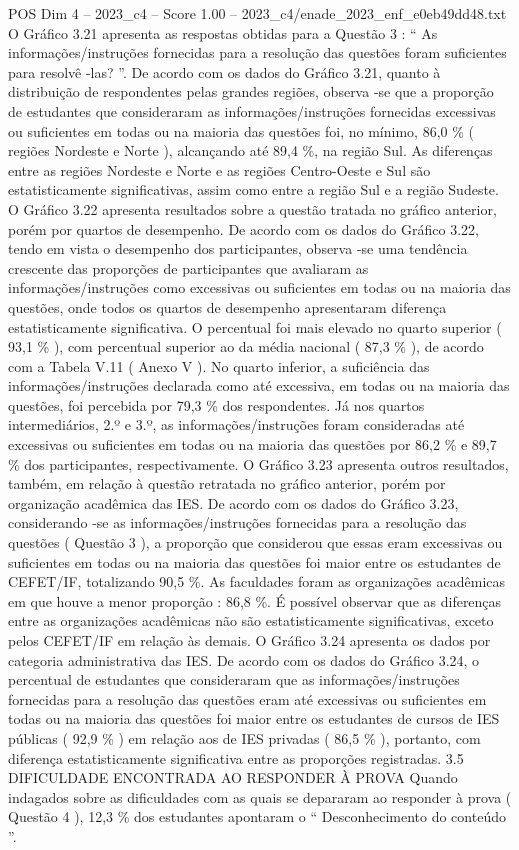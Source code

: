 \begin{textsample}{POS Dim 4 – 2023\_c4 – Score 1.00 – 2023\_c4/enade\_2023\_enf\_e0eb49dd48.txt}
O Gráfico 3.21 apresenta as respostas obtidas para a Questão 3 : “ As informações/instruções fornecidas para a resolução das questões foram suficientes para resolvê -las? ”.
De acordo com os dados do Gráfico 3.21, quanto à distribuição de respondentes pelas grandes regiões, observa -se que a proporção de estudantes que consideraram as informações/instruções fornecidas excessivas ou suficientes em todas ou na maioria das questões foi, no mínimo, 86,0 \% ( regiões Nordeste e Norte ), alcançando até 89,4 \%, na região Sul.
As diferenças entre as regiões Nordeste e Norte e as regiões Centro-Oeste e Sul são estatisticamente significativas, assim como entre a região Sul e a região Sudeste.
O Gráfico 3.22 apresenta resultados sobre a questão tratada no gráfico anterior, porém por quartos de desempenho.
De acordo com os dados do Gráfico 3.22, tendo em vista o desempenho dos participantes, observa -se uma tendência crescente das proporções de participantes que avaliaram as informações/instruções como excessivas ou suficientes em todas ou na maioria das questões, onde todos os quartos de desempenho apresentaram diferença estatisticamente significativa.
O percentual foi mais elevado no quarto superior ( 93,1 \% ), com percentual superior ao da média nacional ( 87,3 \% ), de acordo com a Tabela V.11 ( Anexo V ).
No quarto inferior, a suficiência das informações/instruções declarada como até excessiva, em todas ou na maioria das questões, foi percebida por 79,3 \% dos respondentes.
Já nos quartos intermediários, 2.º e 3.º, as informações/instruções foram consideradas até excessivas ou suficientes em todas ou na maioria das questões por 86,2 \% e 89,7 \% dos participantes, respectivamente.
O Gráfico 3.23 apresenta outros resultados, também, em relação à questão retratada no gráfico anterior, porém por organização acadêmica das IES.
De acordo com os dados do Gráfico 3.23, considerando -se as informações/instruções fornecidas para a resolução das questões ( Questão 3 ), a proporção que considerou que essas eram excessivas ou suficientes em todas ou na maioria das questões foi maior entre os estudantes de CEFET/IF, totalizando 90,5 \%.
As faculdades foram as organizações acadêmicas em que houve a menor proporção : 86,8 \%.
É possível observar que as diferenças entre as organizações acadêmicas não são estatisticamente significativas, exceto pelos CEFET/IF em relação às demais.
O Gráfico 3.24 apresenta os dados por categoria administrativa das IES.
De acordo com os dados do Gráfico 3.24, o percentual de estudantes que consideraram que as informações/instruções fornecidas para a resolução das questões eram até excessivas ou suficientes em todas ou na maioria das questões foi maior entre os estudantes de cursos de IES públicas ( 92,9 \% ) em relação aos de IES privadas ( 86,5 \% ), portanto, com diferença estatisticamente significativa entre as proporções registradas. 3.5 DIFICULDADE ENCONTRADA AO RESPONDER À PROVA Quando indagados sobre as dificuldades com as quais se depararam ao responder à prova ( Questão 4 ), 12,3 \% dos estudantes apontaram o “ Desconhecimento do conteúdo ”.

\end{textsample}
